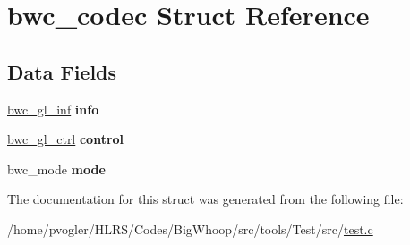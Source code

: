 \hypertarget{structbwc__codec}{}\section{bwc\+\_\+codec Struct Reference}
\label{structbwc__codec}
\subsection*{Data Fields}
\begin{DoxyCompactItemize}
\item 
\mbox{\label{structbwc__codec_ab6a06e74c2512482485f8a53f859729f}} 
\mbox{\hyperlink{structbwc__gl__inf}{bwc\+\_\+gl\+\_\+inf}} {\bfseries info}
\item 
\mbox{\label{structbwc__codec_a95ac90dd9a0220d166e443ff76539fcd}} 
\mbox{\hyperlink{structbwc__gl__ctrl}{bwc\+\_\+gl\+\_\+ctrl}} {\bfseries control}
\item 
\mbox{\label{structbwc__codec_a58a5476d1cf66d21e0634e4363026e78}} 
bwc\+\_\+mode {\bfseries mode}
\end{DoxyCompactItemize}


The documentation for this struct was generated from the following file\+:\begin{DoxyCompactItemize}
\item 
/home/pvogler/\+H\+L\+R\+S/\+Codes/\+Big\+Whoop/src/tools/\+Test/src/\mbox{\hyperlink{test_8c}{test.\+c}}\end{DoxyCompactItemize}
